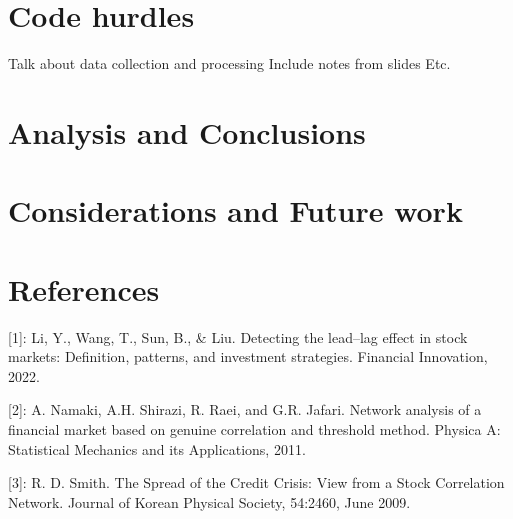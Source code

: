 \documentclass{article}
\begin{document}
\section{Code hurdles}
Talk about data collection and processing
Include notes from slides
Etc.
\section{Analysis and Conclusions}
\section{Considerations and Future work}
\section*{References}
[1]: Li, Y., Wang, T., Sun, B., \& Liu. Detecting the lead–lag effect in stock markets: Definition, patterns, and investment strategies. Financial Innovation, 2022.

[2]: A. Namaki, A.H. Shirazi, R. Raei, and G.R. Jafari. Network analysis of a financial market based on genuine correlation and threshold method. Physica A: Statistical
Mechanics and its Applications, 2011.

[3]: R. D. Smith. The Spread of the Credit Crisis: View
from a Stock Correlation Network. Journal of Korean
Physical Society, 54:2460, June 2009.

\medskip
\small
\end{document}
